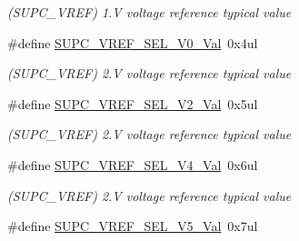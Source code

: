 \begin{DoxyCompactItemize}
\begin{DoxyCompactList}\small\item\em (S\+U\+P\+C\+\_\+\+V\+R\+E\+F) 1.\+V voltage reference typical value \end{DoxyCompactList}\item 
\hypertarget{group___s_a_m_l21___s_u_p_c_gae0d754e14d6933674da87fcce4943a05}{}\#define \hyperlink{group___s_a_m_l21___s_u_p_c_gae0d754e14d6933674da87fcce4943a05}{S\+U\+P\+C\+\_\+\+V\+R\+E\+F\+\_\+\+S\+E\+L\+\_\+V0\+\_\+\+Val}~0x4ul\label{group___s_a_m_l21___s_u_p_c_gae0d754e14d6933674da87fcce4943a05}

\begin{DoxyCompactList}\small\item\em (S\+U\+P\+C\+\_\+\+V\+R\+E\+F) 2.\+V voltage reference typical value \end{DoxyCompactList}\item 
\hypertarget{group___s_a_m_l21___s_u_p_c_ga940bdd6d316685f44a2fdea57ec06829}{}\#define \hyperlink{group___s_a_m_l21___s_u_p_c_ga940bdd6d316685f44a2fdea57ec06829}{S\+U\+P\+C\+\_\+\+V\+R\+E\+F\+\_\+\+S\+E\+L\+\_\+V2\+\_\+\+Val}~0x5ul\label{group___s_a_m_l21___s_u_p_c_ga940bdd6d316685f44a2fdea57ec06829}

\begin{DoxyCompactList}\small\item\em (S\+U\+P\+C\+\_\+\+V\+R\+E\+F) 2.\+V voltage reference typical value \end{DoxyCompactList}\item 
\hypertarget{group___s_a_m_l21___s_u_p_c_gaa7e78450b8097200c0b04af2bb712e72}{}\#define \hyperlink{group___s_a_m_l21___s_u_p_c_gaa7e78450b8097200c0b04af2bb712e72}{S\+U\+P\+C\+\_\+\+V\+R\+E\+F\+\_\+\+S\+E\+L\+\_\+V4\+\_\+\+Val}~0x6ul\label{group___s_a_m_l21___s_u_p_c_gaa7e78450b8097200c0b04af2bb712e72}

\begin{DoxyCompactList}\small\item\em (S\+U\+P\+C\+\_\+\+V\+R\+E\+F) 2.\+V voltage reference typical value \end{DoxyCompactList}\item 
\hypertarget{group___s_a_m_l21___s_u_p_c_ga55e502a549ceeb45df2dcae2250a9007}{}\#define \hyperlink{group___s_a_m_l21___s_u_p_c_ga55e502a549ceeb45df2dcae2250a9007}{S\+U\+P\+C\+\_\+\+V\+R\+E\+F\+\_\+\+S\+E\+L\+\_\+V5\+\_\+\+Val}~0x7ul\label{group___s_a_m_l21___s_u_p_c_ga55e502a549ceeb45df2dcae2250a9007}


\end{DoxyCompactItemize}
